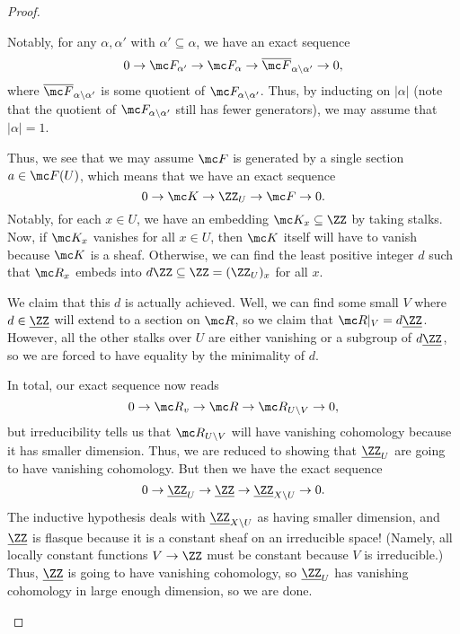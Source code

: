 \documentclass[../notes.tex]{subfiles}
\begin{document}
\begin{proof}
\begin{enumerate}
		Notably, for any $\alpha,\alpha'$ with $\alpha'\subseteq\alpha$, we have an exact sequence
		\[0\to\mc F_{\alpha'}\to\mc F_\alpha\to\overline{\mc F}_{\alpha\setminus\alpha'}\to0,\]
		where $\overline{\mc F}_{\alpha\setminus\alpha'}$ is some quotient of $\mc F_{\alpha\setminus\alpha'}$. Thus, by inducting on $|\alpha|$ (note that the quotient of $\mc F_{\alpha\setminus\alpha'}$ still has fewer generators), we may assume that $|\alpha|=1$.

		Thus, we see that we may assume $\mc F$ is generated by a single section $a\in\mc F(U)$, which means that we have an exact sequence
		\[0\to\mc K\to\ZZ_U\to\mc F\to0.\]
		Notably, for each $x\in U$, we have an embedding $\mc K_x\subseteq\ZZ$ by taking stalks. Now, if $\mc K_x$ vanishes for all $x\in U$, then $\mc K$ itself will have to vanish because $\mc K$ is a sheaf. Otherwise, we can find the least positive integer $d$ such that $\mc R_x$ embeds into $d\ZZ\subseteq\ZZ=(\ZZ_U)_x$ for all $x$.

		We claim that this $d$ is actually achieved. Well, we can find some small $V$ where $d\in\underline\ZZ$ will extend to a section on $\mc R$, so we claim that $\mc R|_V=d\underline\ZZ$. However, all the other stalks over $U$ are either vanishing or a subgroup of $d\underline\ZZ$, so we are forced to have equality by the minimality of $d$.

		In total, our exact sequence now reads
		\[0\to\mc R_v\to\mc R\to\mc R_{U\setminus V}\to0,\]
		but irreducibility tells us that $\mc R_{U\setminus V}$ will have vanishing cohomology because it has smaller dimension. Thus, we are reduced to showing that $\underline\ZZ_U$ are going to have vanishing cohomology. But then we have the exact sequence
		\[0\to\underline\ZZ_U\to\underline\ZZ\to\underline\ZZ_{X\setminus U}\to0.\]
		The inductive hypothesis deals with $\underline\ZZ_{X\setminus U}$ as having smaller dimension, and $\underline\ZZ$ is flasque because it is a constant sheaf on an irreducible space! (Namely, all locally constant functions $V\to\ZZ$ must be constant because $V$ is irreducible.) Thus, $\underline\ZZ$ is going to have vanishing cohomology, so $\underline\ZZ_U$ has vanishing cohomology in large enough dimension, so we are done.
		\qedhere
	\end{enumerate}
\end{proof}
\end{document}

